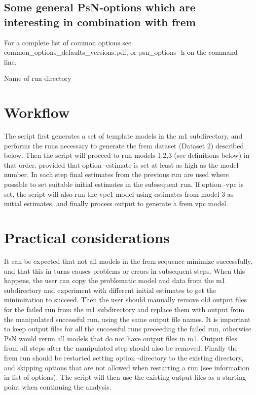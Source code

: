 \subsection{Some general PsN-options which are interesting in combination with frem}
For a complete list of common options see common\_options\_defaults\_versions.pdf, or psn\_options -h on the command-line.

\begin{optionlist}
Name of run directory 
\nextopt
\end{optionlist}

\section{Workflow}
The script first generates a set of template models in the m1 subdirectory, and performs the runs necessary to generate
the frem dataset (Dataset 2) described below. Then the script will proceed to run models 1,2,3 (see definitions below) 
in that order, provided
that option -estimate is set at least as high as the model number. In each step final estimates from the previous run are
used where possible to set suitable initial estimates in the subsequent run. If option -vpc is set, the script will also 
run the vpc1 model using estimates from model 3 as initial estimates, and finally process output to generate a frem vpc model.

\section{Practical considerations}
It can be expected that not all models in the frem sequence minimize successfully, and that this in turns 
causes problems or errors in subsequent steps. 
When this happens, the user can copy the problematic model and data from the m1 subdirectory and experiment with
different initial estimates to get the minimization to succeed. Then the user should manually remove old output files for the
failed run from the m1 subdirectory and replace them with output from the manipulated successful run, using the same 
output file names. It is important to keep output files for all the successful runs preceeding the failed run, 
otherwise PsN would rerun all models that do not have output files
in m1. Output files from all steps after the manipulated step should also be removed.
Finally the frem run should be restarted setting option -directory to the existing directory, and skipping 
options that are not allowed when restarting a run (see information in list of options). The script
will then use the existing output files as a starting point when continuing the analysis.

